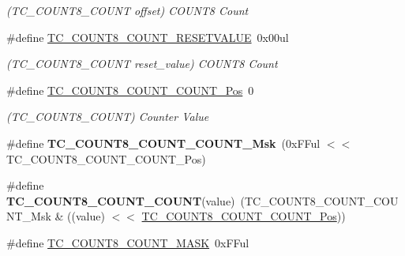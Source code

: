 \begin{DoxyCompactItemize}
\begin{DoxyCompactList}\small\item\em (T\+C\+\_\+\+C\+O\+U\+N\+T8\+\_\+\+C\+O\+U\+N\+T offset) C\+O\+U\+N\+T8 Count \end{DoxyCompactList}\item 
\hypertarget{group___s_a_m_l21___t_c_ga936c21ac34c0dfe4ec67910ef13fe12b}{}\#define \hyperlink{group___s_a_m_l21___t_c_ga936c21ac34c0dfe4ec67910ef13fe12b}{T\+C\+\_\+\+C\+O\+U\+N\+T8\+\_\+\+C\+O\+U\+N\+T\+\_\+\+R\+E\+S\+E\+T\+V\+A\+L\+U\+E}~0x00ul\label{group___s_a_m_l21___t_c_ga936c21ac34c0dfe4ec67910ef13fe12b}

\begin{DoxyCompactList}\small\item\em (T\+C\+\_\+\+C\+O\+U\+N\+T8\+\_\+\+C\+O\+U\+N\+T reset\+\_\+value) C\+O\+U\+N\+T8 Count \end{DoxyCompactList}\item 
\hypertarget{group___s_a_m_l21___t_c_gaafae4aec475e0bb262331b9a90944755}{}\#define \hyperlink{group___s_a_m_l21___t_c_gaafae4aec475e0bb262331b9a90944755}{T\+C\+\_\+\+C\+O\+U\+N\+T8\+\_\+\+C\+O\+U\+N\+T\+\_\+\+C\+O\+U\+N\+T\+\_\+\+Pos}~0\label{group___s_a_m_l21___t_c_gaafae4aec475e0bb262331b9a90944755}

\begin{DoxyCompactList}\small\item\em (T\+C\+\_\+\+C\+O\+U\+N\+T8\+\_\+\+C\+O\+U\+N\+T) Counter Value \end{DoxyCompactList}\item 
\hypertarget{group___s_a_m_l21___t_c_ga11ba271da41b4c44d733730d6af7e043}{}\#define {\bfseries T\+C\+\_\+\+C\+O\+U\+N\+T8\+\_\+\+C\+O\+U\+N\+T\+\_\+\+C\+O\+U\+N\+T\+\_\+\+Msk}~(0x\+F\+Ful $<$$<$ T\+C\+\_\+\+C\+O\+U\+N\+T8\+\_\+\+C\+O\+U\+N\+T\+\_\+\+C\+O\+U\+N\+T\+\_\+\+Pos)\label{group___s_a_m_l21___t_c_ga11ba271da41b4c44d733730d6af7e043}

\item 
\hypertarget{group___s_a_m_l21___t_c_ga2454469d684f3ae8baeb626c5b86e4dd}{}\#define {\bfseries T\+C\+\_\+\+C\+O\+U\+N\+T8\+\_\+\+C\+O\+U\+N\+T\+\_\+\+C\+O\+U\+N\+T}(value)~(T\+C\+\_\+\+C\+O\+U\+N\+T8\+\_\+\+C\+O\+U\+N\+T\+\_\+\+C\+O\+U\+N\+T\+\_\+\+Msk \& ((value) $<$$<$ \hyperlink{group___s_a_m_l21___t_c_gaafae4aec475e0bb262331b9a90944755}{T\+C\+\_\+\+C\+O\+U\+N\+T8\+\_\+\+C\+O\+U\+N\+T\+\_\+\+C\+O\+U\+N\+T\+\_\+\+Pos}))\label{group___s_a_m_l21___t_c_ga2454469d684f3ae8baeb626c5b86e4dd}

\item 
\hypertarget{group___s_a_m_l21___t_c_ga76c5d25efdb436ccc0a1ef6d246b50c9}{}\#define \hyperlink{group___s_a_m_l21___t_c_ga76c5d25efdb436ccc0a1ef6d246b50c9}{T\+C\+\_\+\+C\+O\+U\+N\+T8\+\_\+\+C\+O\+U\+N\+T\+\_\+\+M\+A\+S\+K}~0x\+F\+Ful\label{group___s_a_m_l21___t_c_ga76c5d25efdb436ccc0a1ef6d246b50c9}


\end{DoxyCompactItemize}
